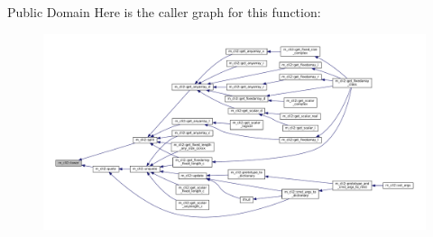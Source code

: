 Public Domain Here is the caller graph for this function\+:
\nopagebreak
\begin{figure}[H]
\begin{center}
\leavevmode
\includegraphics[width=350pt]{namespacem__cli2_a6d2d93ab8471667e632bf7a0e95ebd13_icgraph}
\end{center}
\end{figure}
\mbox{\label{namespacem__cli2_a2d1a2b245e9a5e5897e5bff0afc2a217}} 
